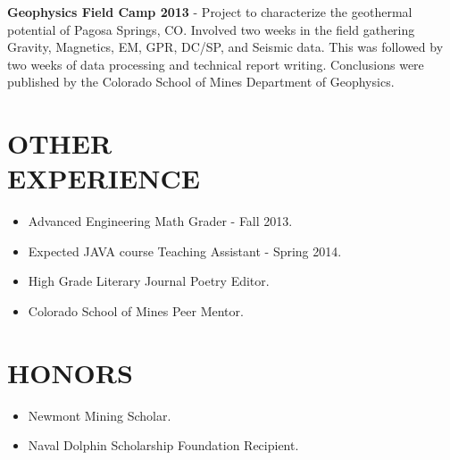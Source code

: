 \documentclass[margin]{res}
\begin{document}
\begin{resume}
			\textbf{Geophysics Field Camp 2013} - Project to characterize the geothermal potential of Pagosa Springs, CO. Involved two weeks in the field gathering Gravity, Magnetics, EM, GPR, DC/SP, and Seismic data. This was followed by two weeks of data processing and technical report writing. Conclusions were published by the Colorado School of Mines Department of Geophysics.
			 
		   

\section{OTHER \\ EXPERIENCE}
		  \begin{itemize}
		    \item Advanced Engineering Math Grader - Fall 2013.
		    \item Expected JAVA course Teaching Assistant - Spring 2014.
			\item High Grade Literary Journal Poetry Editor.			
			\item Colorado School of Mines Peer Mentor.
		  \end{itemize}

\section{HONORS} 
	\begin{itemize}
	 \item Newmont Mining Scholar.
	 \item Naval Dolphin Scholarship Foundation Recipient.
	\end{itemize}
	 
	 
\end{resume} 
\end{document}
